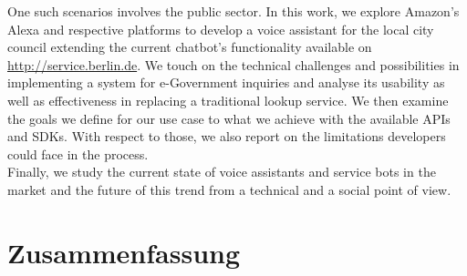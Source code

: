 One such scenarios involves the public sector. In this work, we explore Amazon's Alexa and respective platforms to develop a voice assistant for the local city council extending the current chatbot's functionality available on \href{ https://service.berlin.de/virtueller-assistent/virtueller-assistent-606279.php}{http://service.berlin.de}. We touch on the technical challenges and possibilities in implementing a system for e-Government inquiries and analyse its usability as well as effectiveness in replacing a traditional lookup service. We then examine the goals we define for our use case to what we achieve with the available APIs and SDKs. With respect to those, we also report on the limitations developers could face in the process.\\

Finally, we study the current state of voice assistants and service bots in the market and the future of this trend from a technical and a social point of view.

\newpage
\chapter*{Zusammenfassung}
 \\
\\
\\


